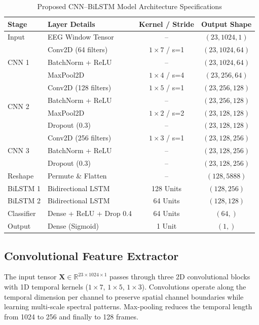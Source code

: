 \documentclass[conference]{IEEEtran}
\begin{document}
\begin{table}[t]
\caption{Proposed CNN--BiLSTM Model Architecture Specifications}
\label{tab:architecture}
\centering
\begin{tabular}{llcc}
\toprule
\textbf{Stage} & \textbf{Layer Details} & \textbf{Kernel / Stride} & \textbf{Output Shape} \\
\midrule
Input & EEG Window Tensor & -- & $(23, 1024, 1)$ \\
\midrule
\multirow{3}{*}{CNN 1} & Conv2D (64 filters) & $1 \times 7$ / s=1 & $(23, 1024, 64)$ \\
 & BatchNorm + ReLU & -- & $(23, 1024, 64)$ \\
 & MaxPool2D & $1 \times 4$ / s=4 & $(23, 256, 64)$ \\
\midrule
\multirow{4}{*}{CNN 2} & Conv2D (128 filters) & $1 \times 5$ / s=1 & $(23, 256, 128)$ \\
 & BatchNorm + ReLU & -- & $(23, 256, 128)$ \\
 & MaxPool2D & $1 \times 2$ / s=2 & $(23, 128, 128)$ \\
 & Dropout (0.3) & -- & $(23, 128, 128)$ \\
\midrule
\multirow{3}{*}{CNN 3} & Conv2D (256 filters) & $1 \times 3$ / s=1 & $(23, 128, 256)$ \\
 & BatchNorm + ReLU & -- & $(23, 128, 256)$ \\
 & Dropout (0.3) & -- & $(23, 128, 256)$ \\
\midrule
Reshape & Permute \& Flatten & -- & $(128, 5888)$ \\
\midrule
BiLSTM 1 & Bidirectional LSTM & 128 Units & $(128, 256)$ \\
BiLSTM 2 & Bidirectional LSTM & 64 Units & $(128, 128)$ \\
\midrule
Classifier & Dense + ReLU + Drop 0.4 & 64 Units & $(64,)$ \\
Output & Dense (Sigmoid) & 1 Unit & $(1,)$ \\
\bottomrule
\end{tabular}
\end{table}

\subsection{Convolutional Feature Extractor}
The input tensor $\mathbf{X} \in \mathbb{R}^{23 \times 1024 \times 1}$ passes through three 2D convolutional blocks with 1D temporal kernels ($1 \times 7$, $1 \times 5$, $1 \times 3$). Convolutions operate along the temporal dimension per channel to preserve spatial channel boundaries while learning multi-scale spectral patterns. Max-pooling reduces the temporal length from 1024 to 256 and finally to 128 frames.
\end{document}
